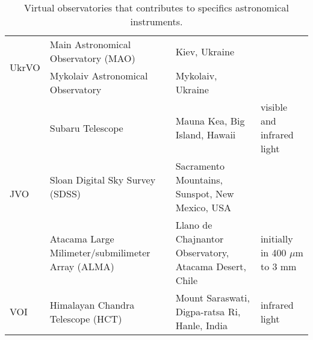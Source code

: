 \begin{table*}[h!t]
\begin{tabular}{|p{1cm}|p{4cm}|p{5cm}|p{6cm}|}
    \hline
    \multirow{2}{3cm}{UkrVO} & Main Astronomical
    Observatory (MAO) & Kiev, Ukraine & \\
     \cline{2-4}
     & Mykolaiv Astronomical Observatory & Mykolaiv, Ukraine & \\
    \hline
    \multirow{3}{3cm}{JVO} & Subaru Telescope &
    Mauna Kea, Big Island, Hawaii & visible and infrared light
    \cite{website:Subaru_EMS} \\
     \cline{2-4}
     & Sloan Digital Sky Survey (SDSS) & Sacramento Mountains, Sunspot, New
     Mexico, USA & \\
     \cline{2-4} 
     & Atacama Large Milimeter/submilimeter Array (ALMA) & Llano de Chajnantor
     Observatory, Atacama Desert, Chile & initially in 400 $ \mu $m to 3 mm \\
    \hline
    VOI & Himalayan Chandra Telescope (HCT) & Mount
    Saraswati, Digpa-ratsa Ri, Hanle, India & infrared light 
    \cite{website:HCT_EMS} \\
    \hline
 \end{tabular}
\caption{Virtual observatories that contributes to specifics astronomical
instruments.}
\label{table:vo_EMS}
\end{table*}

